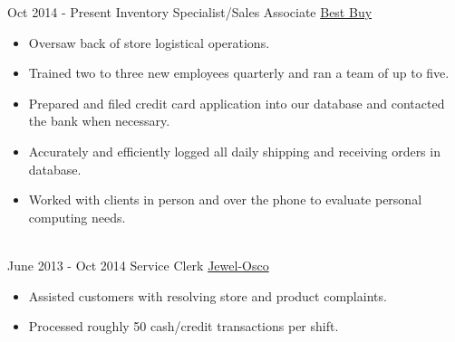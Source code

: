 \documentclass[letterpaper]{twentysecondcv} %
\begin{document}
\begin{twenty} %
\twentyitem
    	{Oct 2014 -}
		{Present}
        {Inventory Specialist/Sales Associate}
        {\href{http://bestbuy.com}{Best Buy}}
        {}
        {\begin{itemize}
        \item Oversaw back of store logistical operations.
        \item Trained two to three new employees quarterly and ran a team of up to five.
        \item Prepared and filed credit card application into our database and contacted the bank when necessary. 
        \item Accurately and efficiently logged all daily shipping and receiving orders in database.
        \item Worked with clients in person and over the phone to evaluate personal computing needs.
        
        \end{itemize}}
        \\
	\twentyitem
    	{June 2013 -}
		{Oct 2014}
        {Service Clerk}
        {\href{http://www.jewelosco.com}{Jewel-Osco}}
        {}
        {\begin{itemize}
        \item Assisted customers with resolving store and product complaints.
        \item Processed roughly 50 cash/credit transactions per shift.
        
    \end{itemize}}
    \\   
    
\end{twenty}
\end{document}
